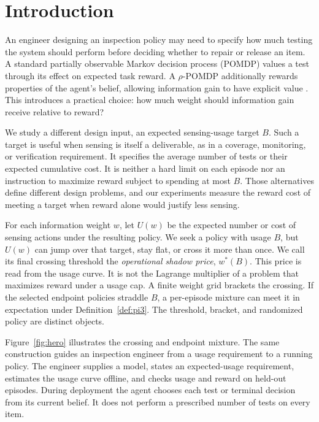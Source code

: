 \documentclass[runningheads]{llncs}
\begin{document}
\section{Introduction}

An engineer designing an inspection policy may need to specify how much testing the system should perform before deciding whether to repair or release an item. A standard partially observable Markov decision process (POMDP) values a test through its effect on expected task reward. A $\rho$-POMDP additionally rewards properties of the agent's belief, allowing information gain to have explicit value \citep{araya2010}. This introduces a practical choice: how much weight should information gain receive relative to reward?

We study a different design input, an expected sensing-usage target $B$. Such a target is useful when sensing is itself a deliverable, as in a coverage, monitoring, or verification requirement. It specifies the average number of tests or their expected cumulative cost. It is neither a hard limit on each episode nor an instruction to maximize reward subject to spending at most $B$. Those alternatives define different design problems, and our experiments measure the reward cost of meeting a target when reward alone would justify less sensing.

For each information weight $w$, let $U(w)$ be the expected number or cost of sensing actions under the resulting policy. We seek a policy with usage $B$, but $U(w)$ can jump over that target, stay flat, or cross it more than once. We call its final crossing threshold the \emph{operational shadow price}, $w^*(B)$. This price is read from the usage curve. It is not the Lagrange multiplier of a problem that maximizes reward under a usage cap. A finite weight grid brackets the crossing. If the selected endpoint policies straddle $B$, a per-episode mixture can meet it in expectation under Definition~\ref{def:pi3}. The threshold, bracket, and randomized policy are distinct objects.

Figure~\ref{fig:hero} illustrates the crossing and endpoint mixture. The same construction guides an inspection engineer from a usage requirement to a running policy. The engineer supplies a model, states an expected-usage requirement, estimates the usage curve offline, and checks usage and reward on held-out episodes. During deployment the agent chooses each test or terminal decision from its current belief. It does not perform a prescribed number of tests on every item.
\end{document}
